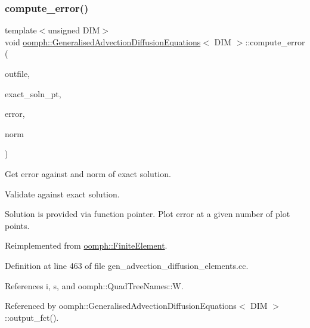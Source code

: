\subsubsection{\texorpdfstring{compute\+\_\+error()}{compute\_error()}\hspace{0.1cm}{\footnotesize\ttfamily [1/2]}}
{\footnotesize\ttfamily template$<$unsigned D\+IM$>$ \\
void \hyperlink{classoomph_1_1GeneralisedAdvectionDiffusionEquations}{oomph\+::\+Generalised\+Advection\+Diffusion\+Equations}$<$ D\+IM $>$\+::compute\+\_\+error (\begin{DoxyParamCaption}\item[{std\+::ostream \&}]{outfile,  }\item[{\hyperlink{classoomph_1_1FiniteElement_a690fd33af26cc3e84f39bba6d5a85202}{Finite\+Element\+::\+Steady\+Exact\+Solution\+Fct\+Pt}}]{exact\+\_\+soln\+\_\+pt,  }\item[{double \&}]{error,  }\item[{double \&}]{norm }\end{DoxyParamCaption})\hspace{0.3cm}{\ttfamily [virtual]}}



Get error against and norm of exact solution. 

Validate against exact solution.

Solution is provided via function pointer. Plot error at a given number of plot points. 

Reimplemented from \hyperlink{classoomph_1_1FiniteElement_a73c79a1f1e5b1d334757812a6bbd58ff}{oomph\+::\+Finite\+Element}.



Definition at line 463 of file gen\+\_\+advection\+\_\+diffusion\+\_\+elements.\+cc.



References i, s, and oomph\+::\+Quad\+Tree\+Names\+::W.



Referenced by oomph\+::\+Generalised\+Advection\+Diffusion\+Equations$<$ D\+I\+M $>$\+::output\+\_\+fct().

\mbox{\label{classoomph_1_1GeneralisedAdvectionDiffusionEquations_ac7ebfa809051e73ec064fea8231811a3}} 
